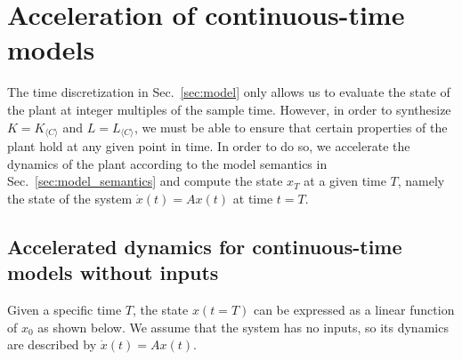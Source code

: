 \documentclass[a4paper,UKenglish]{lipics-v2018}
\newcommand{\mat}[1]{{#1}}
\renewcommand{\vec}[1]{{#1}}
\newcommand{\note}[1]{\textcolor{red}{[#1]}}
\begin{document}

\section{Acceleration of continuous-time models}\label{sec:continuous_time_accel}

The time discretization in Sec.~\ref{sec:model} only allows us to evaluate
the state of the plant at integer multiples of the sample time.  However, in
order to synthesize $\mat{K}=\mat{K}_{\langle C \rangle}$ and
$\mat{L}=\mat{L}_{\langle C \rangle}$, we must be able to ensure that
certain properties of the plant hold at any given point in time.  In order
to do so, we accelerate the dynamics of the plant according to the model
semantics in Sec.~\ref{sec:model_semantics} and compute the state
$\vec{x}_T$ at a given time $T$,
%
%
namely the state of the system $\dot{\vec{x}}(t)=\mat{A}\vec{x}(t)$ at time
$t=T$.

\subsection{Accelerated\! dynamics\! for\! continuous-time\! models\! without\! inputs}\label{sec:cont_acc_no_inputs}
%
Given a specific time $T$, the state $\vec{x}(t=T)$ can be expressed as a
linear function of $\vec{x}_0$ as shown below.  We assume that the system
has no inputs, so its dynamics are described by
$\dot{\vec{x}}(t)=\mat{A}\vec{x}(t)$.
 
\end{document}
